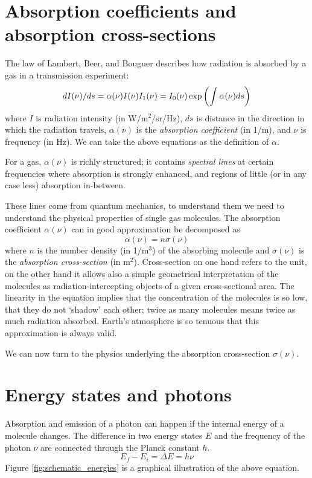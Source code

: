 \section{Absorption coefficients and absorption cross-sections}
\label{sec:absorption}

The law of Lambert, Beer, and Bouguer describes how radiation is
absorbed by a gas in a transmission experiment:
\begin{equation}
  dI(\nu)/ds = \alpha(\nu) I(\nu)\\
  I_1(\nu) = I_0(\nu) \exp \left( \int \alpha(\nu)ds \right)
\end{equation}
where $I$ is radiation intensity (in W/m$^2$/sr/Hz), $ds$ is distance in
the direction in which the radiation travels, $\alpha(\nu)$ is the
\emph{absorption coefficient} (in 1/m), and $\nu$ is frequency (in
Hz). We can take the above equations as the definition of $\alpha$.

For a gas, $\alpha(\nu)$ is richly structured; it contains
\emph{spectral lines} at certain frequencies where absorption is
strongly enhanced, and regions of little (or in any case less)
absorption in-between.

These lines come from quantum mechanics, to understand them we need to
understand the physical properties of single gas molecules. The
absorption coefficient $\alpha(\nu)$ can in good approximation be
decomposed as
\begin{equation}
  \alpha(\nu) = n \sigma(\nu)
\end{equation}
where $n$ is the number density (in 1/m$^3$) of the absorbing molecule
and $\sigma(\nu)$ is the \emph{absorption cross-section} (in
m$^2$). Cross-section on one hand refers to the unit, on the other
hand it allows also a simple geometrical interpretation of the
molecules as radiation-intercepting objects of a given cross-sectional
area. The linearity in the equation implies that the concentration of
the molecules is so low, that they do not `shadow' each other; twice
as many molecules means twice as much radiation absorbed. Earth's
atmosphere is so tenuous that this approximation is always valid. 

We can now turn to the physics underlying the absorption cross-section
$\sigma(\nu)$. 

\section{Energy states and photons}
\label{sec:energy-states}
Absorption and emission of a photon can happen if the internal energy of a
molecule changes. The difference in two energy states $E$ and the frequency of
the photon $\nu$ are connected through the Planck constant $h$.
\begin{equation}
  E_f - E_i = \Delta E = h \nu
\end{equation}
Figure \ref{fig:schematic_energies} is a graphical illustration of the
above equation.

